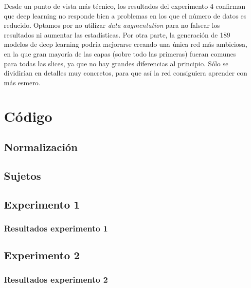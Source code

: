 Desde un punto de vista más técnico, los resultados del experimento 4 confirman que deep learning no responde bien a problemas en los que el número de datos es reducido. Optamos por no utilizar \textit{data augmentation} para no falsear los resultados ni aumentar las estadísticas. Por otra parte, la generación de 189 modelos de deep learning podría mejorarse creando una única red más ambiciosa, en la que gran mayoría de las capas (sobre todo las primeras) fueran comunes para todas las slices, ya que no hay grandes diferencias al principio. Sólo se dividirían en detalles muy concretos, para que así la red consiguiera aprender con más esmero. 
\newpage

\section{Código}

\subsection{Normalización}



\subsection{Sujetos}




\subsection{Experimento 1}



\subsubsection{Resultados experimento 1}



\subsection{Experimento 2}



\subsubsection{Resultados experimento 2}


